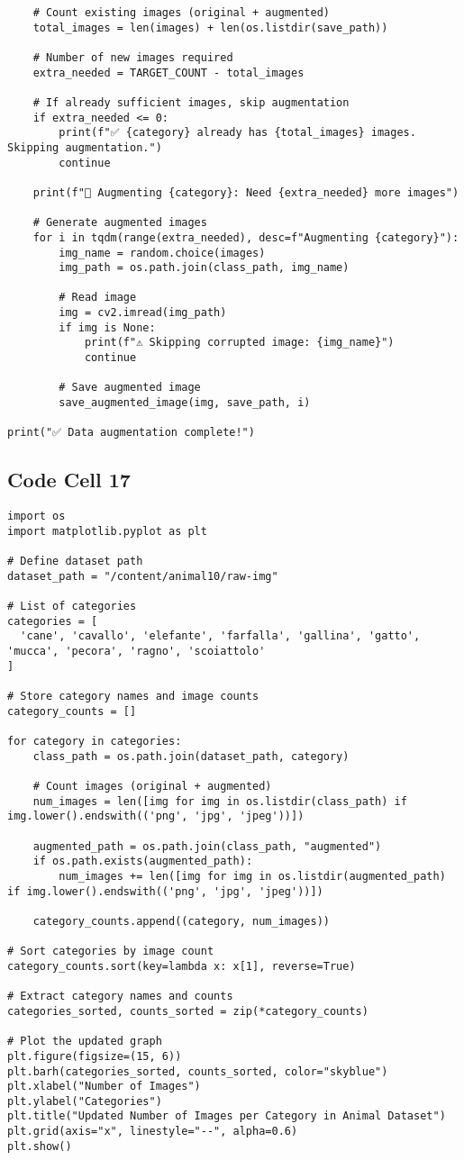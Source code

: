 \documentclass{article}
\begin{document}
\begin{lstlisting}
    # Count existing images (original + augmented)
    total_images = len(images) + len(os.listdir(save_path))

    # Number of new images required
    extra_needed = TARGET_COUNT - total_images

    # If already sufficient images, skip augmentation
    if extra_needed <= 0:
        print(f"✅ {category} already has {total_images} images. Skipping augmentation.")
        continue

    print(f"📢 Augmenting {category}: Need {extra_needed} more images")

    # Generate augmented images
    for i in tqdm(range(extra_needed), desc=f"Augmenting {category}"):
        img_name = random.choice(images)
        img_path = os.path.join(class_path, img_name)

        # Read image
        img = cv2.imread(img_path)
        if img is None:
            print(f"⚠️ Skipping corrupted image: {img_name}")
            continue

        # Save augmented image
        save_augmented_image(img, save_path, i)

print("✅ Data augmentation complete!")
\end{lstlisting}

\subsection*{Code Cell 17}
\begin{lstlisting}
import os
import matplotlib.pyplot as plt

# Define dataset path
dataset_path = "/content/animal10/raw-img"

# List of categories
categories = [
  'cane', 'cavallo', 'elefante', 'farfalla', 'gallina', 'gatto', 'mucca', 'pecora', 'ragno', 'scoiattolo'
]

# Store category names and image counts
category_counts = []

for category in categories:
    class_path = os.path.join(dataset_path, category)

    # Count images (original + augmented)
    num_images = len([img for img in os.listdir(class_path) if img.lower().endswith(('png', 'jpg', 'jpeg'))])

    augmented_path = os.path.join(class_path, "augmented")
    if os.path.exists(augmented_path):
        num_images += len([img for img in os.listdir(augmented_path) if img.lower().endswith(('png', 'jpg', 'jpeg'))])

    category_counts.append((category, num_images))

# Sort categories by image count
category_counts.sort(key=lambda x: x[1], reverse=True)

# Extract category names and counts
categories_sorted, counts_sorted = zip(*category_counts)

# Plot the updated graph
plt.figure(figsize=(15, 6))
plt.barh(categories_sorted, counts_sorted, color="skyblue")
plt.xlabel("Number of Images")
plt.ylabel("Categories")
plt.title("Updated Number of Images per Category in Animal Dataset")
plt.grid(axis="x", linestyle="--", alpha=0.6)
plt.show()
\end{lstlisting}
\end{document}
